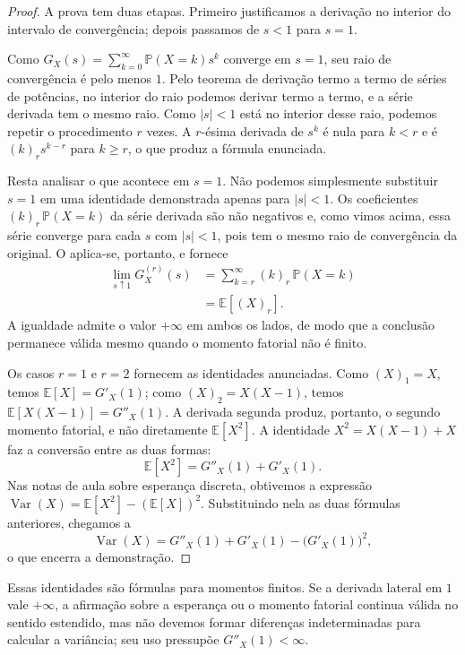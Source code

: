 \documentclass[12pt,portuguese]{article}
\theoremstyle{definition}
\theoremstyle{plainexercise}
\theoremstyle{starredexercise}
\theoremstyle{definition}
\begin{document}
\begin{proof}
A prova tem duas etapas. Primeiro justificamos a derivação no interior do
intervalo de convergência; depois passamos de $s<1$ para $s=1$.

Como $G_X(s)=\sum_{k=0}^{\infty}\mathbb{P}(X=k)s^k$ converge em $s=1$,
seu raio de convergência é pelo menos $1$. Pelo teorema de derivação
termo a termo de séries de potências, no interior do raio podemos derivar
termo a termo, e a série derivada tem o mesmo raio. Como $|s|<1$ está no
interior desse raio, podemos repetir o procedimento $r$ vezes. A $r$-ésima
derivada de $s^k$ é nula para $k<r$ e é $(k)_r s^{k-r}$ para
$k\geqslant r$, o que produz a fórmula enunciada.

Resta analisar o que acontece em $s=1$. Não podemos simplesmente substituir $s=1$ em uma
identidade demonstrada apenas para $|s|<1$. Os coeficientes
$(k)_r\,\mathbb{P}(X=k)$ da série derivada são não negativos e, como vimos
acima, essa série converge para cada $s$ com $|s|<1$, pois tem o mesmo raio
de convergência da original. O  aplica-se, portanto, e
fornece
\begin{align*}
\lim_{s\uparrow 1}G_X^{(r)}(s)
&=\sum_{k=r}^{\infty}(k)_r\,\mathbb{P}(X=k)
\\[0.3cm]
&=\mathbb{E}[(X)_r].
\end{align*}
A igualdade admite o valor $+\infty$ em ambos os lados, de modo que a
conclusão permanece válida mesmo quando o momento fatorial não é finito.

Os casos $r=1$ e $r=2$ fornecem as identidades anunciadas. Como
$(X)_1=X$, temos $\mathbb{E}[X]=G'_X(1)$; como $(X)_2=X(X-1)$, temos
$\mathbb{E}[X(X-1)]=G''_X(1)$. A derivada segunda produz, portanto, o
segundo momento fatorial, e não diretamente $\mathbb{E}[X^2]$. A
identidade $X^2=X(X-1)+X$ faz a conversão entre as duas formas:
\[
\mathbb{E}[X^2]=G''_X(1)+G'_X(1).
\]
Nas notas de aula sobre esperança discreta, obtivemos a expressão
$\operatorname{Var}(X)=\mathbb{E}[X^2]-(\mathbb{E}[X])^2$. Substituindo
nela as duas fórmulas anteriores, chegamos a
\[
\operatorname{Var}(X)
=G''_X(1)+G'_X(1)-\bigl(G'_X(1)\bigr)^2,
\]
o que encerra a demonstração.
\end{proof}

Essas identidades são fórmulas para momentos finitos. Se a derivada lateral em
$1$ vale $+\infty$, a afirmação sobre a esperança ou o momento fatorial continua
válida no sentido estendido, mas não devemos formar diferenças indeterminadas
para calcular a variância; seu uso pressupõe $G''_X(1)<\infty$.
\end{document}
